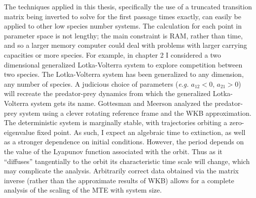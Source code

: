 \iffalse
Just as the Hubbell model is employed to explain the abundance distribution of current extant species, coalescent theory uses a Moran or Kimura model to understand paleontological data and other data of the past \cite{Kingman1982,Blythe2007,Rogers2014}.  
It seeks to find the time to coalescence, which means the time (in the past) when a common ancestor existed for two variants of a species (in the present). 
The classic model assumes the variants behave the same - in my language, they occupy the same niche, and have niche overlap of one. 
The theory has been modified to include explicit fitness advantage \cite{???} but the unbiased case of incomplete niche overlap has not been tried. %
Seeing as decreasing the niche overlap from unity acts to increase the timescales of the system, as I have shown in this thesis, using my results to extend coalescent theory when appropriate would similarly suggest that variants diverged longer ago than the classic theory predicts. 
\fi

The techniques applied in this thesis, specifically the use of a truncated transition matrix being inverted to solve for the first passage times exactly, can easily be applied to other low species number systems. 
The calculation for each point in parameter space is not lengthy; the main constraint is RAM, rather than time, and so a larger memory computer could deal with problems with larger carrying capacities or more species. %
For example, in chapter 2 I considered a two dimensional generalized Lotka-Volterra system to explore competition between two species. 
The Lotka-Volterra system has been generalized to any dimension, any number of species. 
A judicious choice of parameters (\emph{e.g.} $a_{12}<0$, $a_{21}>0$) will recreate the predator-prey dynamics from which the generalized Lotka-Volterra system gets its name. 
Gottesman and Meerson \cite{Gottesman2012} analyzed the predator-prey system using a clever rotating reference frame and the WKB approximation. 
The deterministic system is marginally stable, with trajectories orbiting a zero-eigenvalue fixed point. 
As such, I expect an algebraic time to extinction, as well as a stronger dependence on initial conditions. 
However, the period depends on the value of the Lyapunov function associated with the orbit. %
Thus as it ``diffuses'' tangentially to the orbit its characteristic time scale will change, which may complicate the analysis. 
Arbitrarily correct data obtained via the matrix inverse (rather than the approximate results of WKB) allows for a complete analysis of the scaling of the MTE with system size. 

